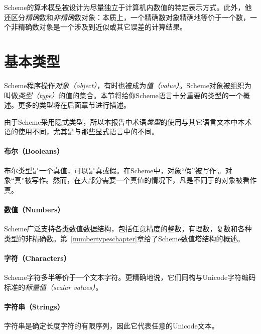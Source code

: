 Scheme的算术模型被设计为尽量独立于计算机内数值的特定表示方式。此外，他
还区分\textit{精确}数和\textit{非精确}数对象：本质上，一个精确数对象精确地等价于一个数，一个非精确数对象是一个涉及到近似或其它误差的计算结果。

\section{基本类型}

Scheme程序操作\textit{对象（object）}，有时也被成为\textit{值（value）}。Scheme对象被组织为叫做\textit{类型（type）}的值的集合。本节将给你Scheme语言十分重要的类型的一个概述。更多的类型将在后面章节进行描述。

\begin{note}
  由于Scheme采用隐式类型，所以本报告中术语\textit{类型}的使用与其它语言文本中本术语的使用不同，尤其是与那些显式语言中的不同。
\end{note}

\paragraph{布尔（Booleans）}

布尔类型是一个真值，可以是真或假。在Scheme中，对象“假”被写作`\schfalse{}。对象“真”被写作\schtrue{}。然而，在大部分需要一个真值的情况下，凡是不同于\schfalse{}的对象被看作真。

\paragraph{数值（Numbers）}

Scheme广泛支持各类数值数据结构，包括任意精度的整数，有理数，复数和各种类型的非精确数。第~\ref{numbertypeschapter}章给了Scheme数值塔结构的概述。

\paragraph{字符（Characters）}

Scheme字符多半等价于一个文本字符。更精确地说，它们同构与Unicode字符编码标准的\textit{标量值（scalar values）}。

\paragraph{字符串（Strings）}

字符串是确定长度字符的有限序列，因此它代表任意的Unicode文本。

